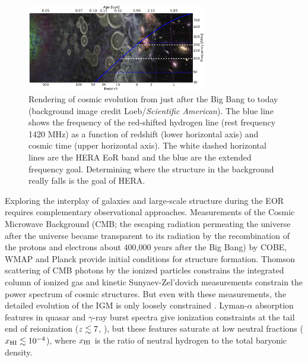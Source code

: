 \documentclass[preprint,11pt]{aastex}
\begin{document}
\begin{figure}[h!]
	\centering
	\includegraphics[width=0.7\textwidth]{plots/cosmicEvo.png}
	\caption{Rendering of cosmic evolution from just after the Big Bang to today (background image credit Loeb/{\em Scientific American}).  The blue line shows the frequency of the red-shifted hydrogen line (rest frequency 1420 MHz) as a function of redshift (lower horizontal axis) and cosmic time (upper horizontal axis).  The white dashed horizontal lines are the HERA EoR band and the blue are the extended frequency goal.  Determining where the structure in the background really falls is the
goal of HERA.} 
	\label{fig:cosmos}
\end{figure}


Exploring the interplay of galaxies and large-scale structure during the EOR
requires complementary observational approaches. Measurements of the Cosmic Microwave Background 
(CMB; the escaping radiation permeating the universe after the universe became
transparent to its radiation by the recombination of the protons and electrons about 400,000 years after the Big Bang)  by COBE, WMAP and Planck provide initial conditions for structure formation.  Thomson
scattering of CMB photons by the ionized particles constrains the integrated column of 
ionized gas and kinetic Sunyaev-Zel'dovich measurements constrain the power spectrum of cosmic structures.
But even with these measurements, the detailed evolution of the IGM 
is only loosely constrained \citep{haiman_holder2003,mortonson_hu2008,zahn_etal2012,mesinger_et_al2012}.
Lyman-$\alpha$ absorption features in quasar and $\gamma$-ray burst spectra give 
ionization constraints at the tail end of reionization 
($z\lesssim7$, \citealt{fan_et_al2006, mcgreer_et_al2015}), but these features 
saturate at low neutral fractions
($x_{\rm HI} \lesssim 10^{-4}$), where $x_{\rm HI}$ is the ratio of neutral hydrogen to the total baryonic density. 
\end{document}
